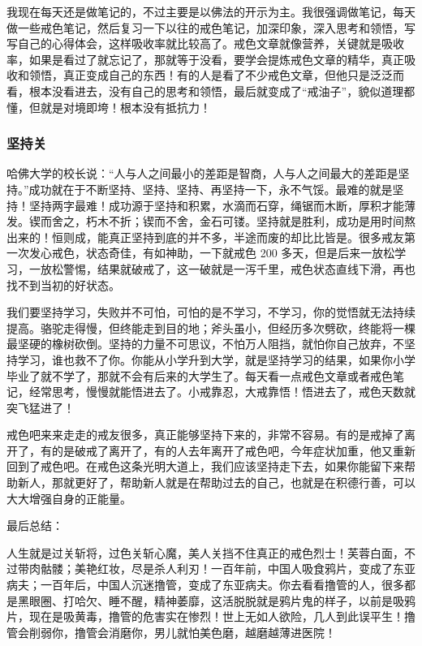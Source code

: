 \documentclass{ctexart}
\begin{document}
我现在每天还是做笔记的，不过主要是以佛法的开示为主。我很强调做笔记，每天做一些戒色笔记，然后复习一下以往的戒色笔记，加深印象，深入思考和领悟，写写自己的心得体会，这样吸收率就比较高了。戒色文章就像营养，关键就是吸收率，如果是看过了就忘记了，那就等于没看，要学会提炼戒色文章的精华，真正吸收和领悟，真正变成自己的东西！有的人是看了不少戒色文章，但他只是泛泛而看，根本没看进去，没有自己的思考和领悟，最后就变成了“戒油子”，貌似道理都懂，但就是对境即垮！根本没有抵抗力！

\subsubsection{坚持关}

哈佛大学的校长说：“人与人之间最小的差距是智商，人与人之间最大的差距是坚持。”成功就在于不断坚持、坚持、坚持、再坚持一下，永不气馁。最难的就是坚持！坚持两字最难！成功源于坚持和积累，水滴而石穿，绳锯而木断，厚积才能薄发。锲而舍之，朽木不折；锲而不舍，金石可镂。坚持就是胜利，成功是用时间熬出来的！恒则成，能真正坚持到底的并不多，半途而废的却比比皆是。很多戒友第一次发心戒色，状态奇佳，有如神助，一下就戒色 200 多天，但是后来一放松学习，一放松警惕，结果就破戒了，这一破就是一泻千里，戒色状态直线下滑，再也找不到当初的好状态。

我们要坚持学习，失败并不可怕，可怕的是不学习，不学习，你的觉悟就无法持续提高。骆驼走得慢，但终能走到目的地；斧头虽小，但经历多次劈砍，终能将一棵最坚硬的橡树砍倒。坚持的力量不可思议，不怕万人阻挡，就怕你自己放弃，不坚持学习，谁也救不了你。你能从小学升到大学，就是坚持学习的结果，如果你小学毕业了就不学了，那就不会有后来的大学生了。每天看一点戒色文章或者戒色笔记，经常思考，慢慢就能悟进去了。小戒靠忍，大戒靠悟！悟进去了，戒色天数就突飞猛进了！

戒色吧来来走走的戒友很多，真正能够坚持下来的，非常不容易。有的是戒掉了离开了，有的是破戒了离开了，有的人去年离开了戒色吧，今年症状加重，他又重新回到了戒色吧。在戒色这条光明大道上，我们应该坚持走下去，如果你能留下来帮助新人，那就更好了，帮助新人就是在帮助过去的自己，也就是在积德行善，可以大大增强自身的正能量。

最后总结：

人生就是过关斩将，过色关斩心魔，美人关挡不住真正的戒色烈士！芙蓉白面，不过带肉骷髅；美艳红妆，尽是杀人利刃！一百年前，中国人吸食鸦片，变成了东亚病夫；一百年后，中国人沉迷撸管，变成了东亚病夫。你去看看撸管的人，很多都是黑眼圈、打哈欠、睡不醒，精神萎靡，这活脱脱就是鸦片鬼的样子，以前是吸鸦片，现在是吸黄毒，撸管的危害实在惨烈！世上无如人欲险，几人到此误平生！撸管会削弱你，撸管会消磨你，男儿就怕美色磨，越磨越薄进医院！
\end{document}
